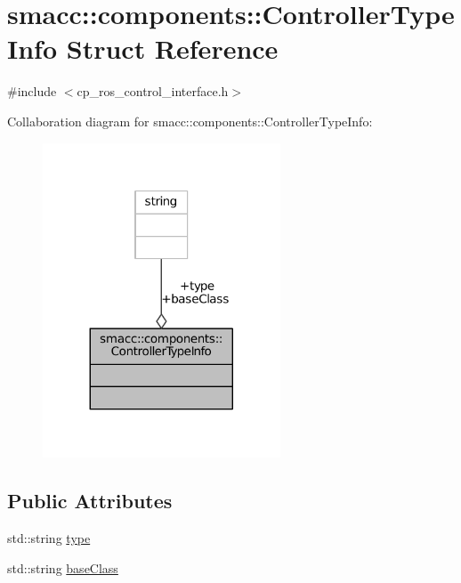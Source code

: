 \hypertarget{structsmacc_1_1components_1_1ControllerTypeInfo}{}\section{smacc\+:\+:components\+:\+:Controller\+Type\+Info Struct Reference}
\label{structsmacc_1_1components_1_1ControllerTypeInfo}


{\ttfamily \#include $<$cp\+\_\+ros\+\_\+control\+\_\+interface.\+h$>$}



Collaboration diagram for smacc\+:\+:components\+:\+:Controller\+Type\+Info\+:
\nopagebreak
\begin{figure}[H]
\begin{center}
\leavevmode
\includegraphics[width=200pt]{structsmacc_1_1components_1_1ControllerTypeInfo__coll__graph}
\end{center}
\end{figure}
\subsection*{Public Attributes}
\begin{DoxyCompactItemize}
\item 
std\+::string \hyperlink{structsmacc_1_1components_1_1ControllerTypeInfo_a8b66de0e92b5b6b913d6b802a0495637}{type}
\item 
std\+::string \hyperlink{structsmacc_1_1components_1_1ControllerTypeInfo_a4506855fc728c39046bdb4f98a6a61f3}{base\+Class}
\end{DoxyCompactItemize}


